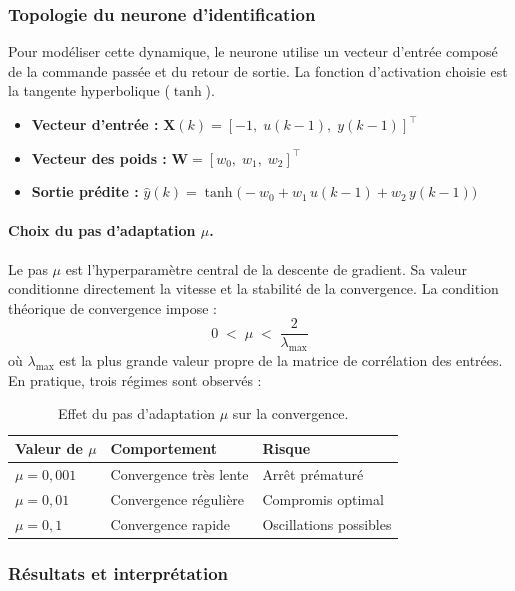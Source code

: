 \subsubsection{Topologie du neurone d'identification}

Pour modéliser cette dynamique, le neurone utilise un vecteur d'entrée composé de la commande passée et du retour de sortie. La fonction d'activation choisie est la tangente hyperbolique ($\tanh$).

\begin{itemize}[label=$\bullet$]
	\item \textbf{Vecteur d'entrée :}
	$\mathbf{X}(k) = [-1,\; u(k-1),\; y(k-1)]^\top$
	\item \textbf{Vecteur des poids :}
	$\mathbf{W} = [w_0,\; w_1,\; w_2]^\top$
	\item \textbf{Sortie prédite :}
	$\hat{y}(k) = \tanh\!\bigl(-w_0 + w_1\,u(k-1)
	+ w_2\,y(k-1)\bigr)$
\end{itemize}

\paragraph{Choix du pas d'adaptation $\mu$.}
Le pas $\mu$ est l'hyperparamètre central de la descente de gradient. Sa valeur conditionne directement la vitesse et la stabilité de la convergence. La condition théorique de convergence impose :
\[
0 \;<\; \mu \;<\; \frac{2}{\lambda_{\max}}
\]
où $\lambda_{\max}$ est la plus grande valeur propre de la matrice de corrélation des entrées. En pratique, trois régimes sont observés :

\begin{table}[H]
	\centering
	\caption{Effet du pas d'adaptation $\mu$ sur la convergence.}
	\renewcommand{\arraystretch}{1.3}
	\begin{tabular}{lll}
		\hline
		\textbf{Valeur de $\mu$} & \textbf{Comportement}    & \textbf{Risque}        \\
		\hline
		$\mu = 0{,}001$          & Convergence très lente   & Arrêt prématuré        \\
		$\mu = 0{,}01$           & Convergence régulière    & Compromis optimal      \\
		$\mu = 0{,}1$            & Convergence rapide       & Oscillations possibles \\
		\hline
	\end{tabular}
	\label{tab:mu_convergence}
\end{table}

\subsubsection{Résultats et interprétation}

